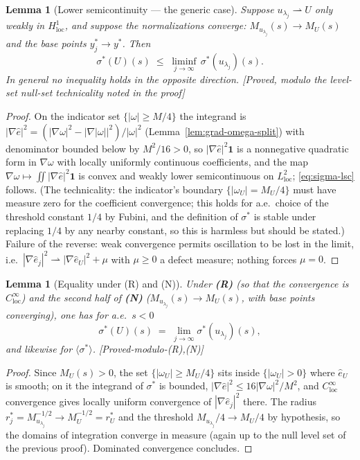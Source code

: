\documentclass[11pt]{article}
\newtheorem{lemma}[theorem]{Lemma}
\theoremstyle{definition}
\theoremstyle{remark}
\begin{document}
\begin{lemma}[Lower semicontinuity --- the generic case]
  \label{lem:sigma-semicontinuity}
  Suppose $u_{\lambda_j}\rightharpoonup U$ only weakly in
  $H^1_{\mathrm{loc}}$, and suppose the normalizations converge:
  $M_{u_{\lambda_j}}(s)\to M_U(s)$ and the base points
  $y^*_j\to y^*$. Then
  \begin{equation}\label{eq:sigma-lsc}
    \sigma^*(U)(s) \;\leq\; \liminf_{j\to\infty}\,\sigma^*(u_{\lambda_j})(s) .
  \end{equation}
  In general \emph{no} inequality holds in the opposite direction.
  \emph{[Proved, modulo the level-set null-set technicality noted in the
  proof]}
\end{lemma}
\begin{proof}
  On the indicator set $\{|\omega|\geq M/4\}$ the integrand is
  $|\nabla\hat e|^2 = (|\nabla\omega|^2-|\nabla|\omega||^2)/|\omega|^2$
  (Lemma~\ref{lem:grad-omega-split}) with denominator bounded below by
  $M^2/16>0$, so $|\nabla\hat e|^2\mathbf{1}$ is a nonnegative quadratic
  form in $\nabla\omega$ with locally uniformly continuous coefficients, and
  the map $\nabla\omega\mapsto\iint|\nabla\hat e|^2\mathbf{1}$ is convex and
  weakly lower semicontinuous on $L^2_{\mathrm{loc}}$; \eqref{eq:sigma-lsc}
  follows. (The technicality: the indicator's boundary
  $\{|\omega_U| = M_U/4\}$ must have measure zero for the coefficient
  convergence; this holds for a.e.\ choice of the threshold constant $1/4$ by
  Fubini, and the definition of $\sigma^*$ is stable under replacing $1/4$ by
  any nearby constant, so this is harmless but should be stated.)
  Failure of the reverse: weak convergence permits oscillation to be lost in
  the limit, i.e.\ $|\nabla\hat e_j|^2\rightharpoonup |\nabla\hat e_U|^2 +
  \mu$ with $\mu\geq0$ a defect measure; nothing forces $\mu=0$.
\end{proof}

\begin{lemma}[Equality under (R) and (N)]\label{lem:sigma-equality}
  Under \textbf{(R)} (so that the convergence is
  $C^\infty_{\mathrm{loc}}$) and the second half of \textbf{(N)}
  ($M_{u_{\lambda_j}}(s)\to M_U(s)$, with base points converging), one has
  for a.e.\ $s<0$
  \[
    \sigma^*(U)(s) \;=\; \lim_{j\to\infty}\sigma^*(u_{\lambda_j})(s),
  \]
  and likewise for $\langle\sigma^*\rangle$.
  \emph{[Proved-modulo-(R),(N)]}
\end{lemma}
\begin{proof}
  Since $M_U(s)>0$, the set $\{|\omega_U|\geq M_U/4\}$ sits inside
  $\{|\omega_U|>0\}$ where $\hat e_U$ is smooth; on it the integrand of
  $\sigma^*$ is bounded, $|\nabla\hat e|^2\leq 16|\nabla\omega|^2/M^2$, and
  $C^\infty_{\mathrm{loc}}$ convergence gives locally uniform convergence of
  $|\nabla\hat e_j|^2$ there. The radius $r^*_j = M_{u_{\lambda_j}}^{-1/2}\to
  M_U^{-1/2}=r^*_U$ and the threshold $M_{u_{\lambda_j}}/4\to M_U/4$ by
  hypothesis, so the domains of integration converge in measure (again up to
  the null level set of the previous proof). Dominated convergence
  concludes.
\end{proof}
\end{document}
